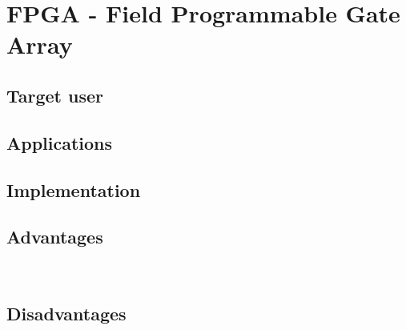 \documentclass[a3paper, landscape, twocolumn]{article}
\begin{document}
\section*{FPGA - Field Programmable Gate Array}
\subsection*{Target user}
\lipsum[1]
\subsection*{Applications}
\lipsum[1]
\subsection*{Implementation}
\lipsum[1]
\noindent
\begin{minipage}{0.485\linewidth}
\subsection*{Advantages}
\lipsum[1]
\end{minipage}
\begin{minipage}{0.02\linewidth}
~
\end{minipage}
\begin{minipage}{0.485\linewidth}
\subsection*{Disadvantages}
\lipsum[1]
\end{minipage}
\nocite{*}

\end{document}
